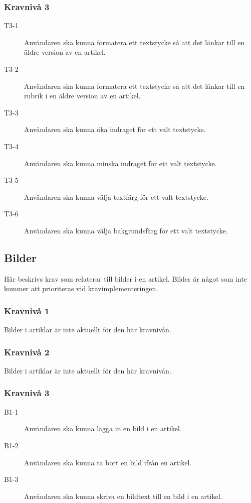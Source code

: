 \subsubsection{Kravnivå 3}
\begin{description}
\item[T3-1] Användaren ska kunna formatera ett textstycke så att det länkar till en äldre version av en artikel.
\item[T3-2] Användaren ska kunna formatera ett textstycke så att det länkar till en rubrik i en äldre version av en artikel.
\item[T3-3] Användaren ska kunna öka indraget för ett valt textstycke.
\item[T3-4] Användaren ska kunna minska indraget för ett valt textstycke.
\item[T3-5] Användaren ska kunna välja textfärg för ett valt textstycke.
\item[T3-6] Användaren ska kunna välja bakgrundsfärg för ett valt textstycke.
\end{description}

\subsection{Bilder}
Här beskrivs krav som relaterar till bilder i en artikel. Bilder är något som inte kommer att prioriteras vid kravimplementeringen.

\subsubsection{Kravnivå 1}
Bilder i artiklar är inte aktuellt för den här kravnivån.

\subsubsection{Kravnivå 2}
Bilder i artiklar är inte aktuellt för den här kravnivån.

\subsubsection{Kravnivå 3}
\begin{description}
\item[B1-1] Användaren ska kunna lägga in en bild i en artikel.
\item[B1-2] Användaren ska kunna ta bort en bild ifrån en artikel.
\item[B1-3] Användaren ska kunna skriva en bildtext till en bild i en artikel.
\end{description}

